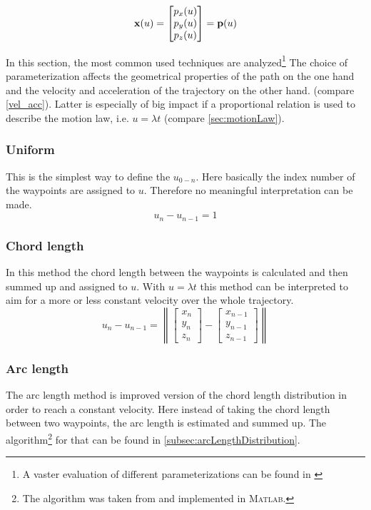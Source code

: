 \begin{equation}
{\bf x}(u) =  \begin{bmatrix} p_x(u) \\ p_y(u) \\p_z(u) \end{bmatrix}
   ={\bf p}(u)
\end{equation}


In this section, the most common used techniques are analyzed\footnote{A vaster evaluation of different parameterizations can be found in \cite{haron}} The choice of parameterization affects the geometrical properties of the path on the one hand and the velocity and acceleration of the trajectory on the other hand. (compare \eqref{vel_acc}). Latter is especially of big impact if a proportional relation is used to describe the motion law, i.e. $u=\lambda t$ (compare \ref{sec:motionLaw}).

\subsubsection{Uniform}
This is the simplest way to define the $u_{0-n}$. Here basically the index number of the waypoints are assigned to $u$. Therefore no meaningful interpretation can be made.
\begin{equation*}
u_n-u_{n-1}=1
\end{equation*}
\subsubsection{Chord length}
In this method the chord length between the waypoints is calculated and then summed up and assigned to $u$. With $u=\lambda t$ this method can be interpreted to aim for a more or less constant velocity over the whole trajectory.
\begin{equation*}
u_n-u_{n-1}=\left \| \begin{bmatrix}x_n\\y_n\\z_n \end{bmatrix}-\begin{bmatrix}x_{n-1}\\y_{n-1}\\z_{n-1} \end{bmatrix}\right \|
\end{equation*}
\subsubsection{Arc length}
The arc length method is improved version of the chord length distribution in order to reach a constant velocity. Here instead of taking the chord length between two waypoints, the arc length is estimated and summed up. The algorithm\footnote{The algorithm was taken from \cite{engeln} and implemented in \textsc{Matlab}.} for that can be found in \ref{subsec:arcLengthDistribution}.

